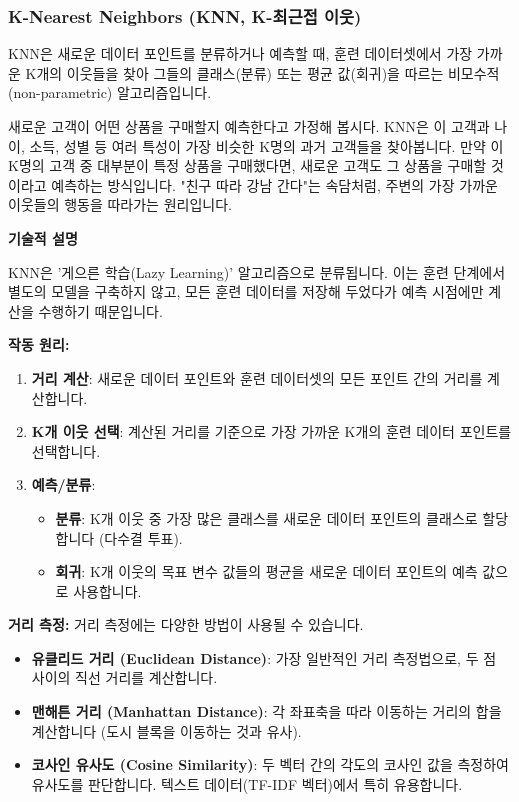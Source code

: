 \documentclass[11pt,a4paper]{article}
\theoremstyle{definition}
\begin{document}
\subsubsection{K-Nearest Neighbors (KNN, K-최근접 이웃)}

\begin{summarybox}[title={한 줄 핵심 요약}]
KNN은 새로운 데이터 포인트를 분류하거나 예측할 때, 훈련 데이터셋에서 가장 가까운 K개의 이웃들을 찾아 그들의 클래스(분류) 또는 평균 값(회귀)을 따르는 비모수적(non-parametric) 알고리즘입니다.
\end{summarybox}

\begin{examplebox}[title={직관적 예시/비유}]
새로운 고객이 어떤 상품을 구매할지 예측한다고 가정해 봅시다. KNN은 이 고객과 나이, 소득, 성별 등 여러 특성이 가장 비슷한 K명의 과거 고객들을 찾아봅니다. 만약 이 K명의 고객 중 대부분이 특정 상품을 구매했다면, 새로운 고객도 그 상품을 구매할 것이라고 예측하는 방식입니다. "친구 따라 강남 간다"는 속담처럼, 주변의 가장 가까운 이웃들의 행동을 따라가는 원리입니다.
\end{examplebox}

\textbf{기술적 설명}

KNN은 '게으른 학습(Lazy Learning)' 알고리즘으로 분류됩니다. 이는 훈련 단계에서 별도의 모델을 구축하지 않고, 모든 훈련 데이터를 저장해 두었다가 예측 시점에만 계산을 수행하기 때문입니다.

\textbf{작동 원리:}
\begin{enumerate}
    \item \textbf{거리 계산}: 새로운 데이터 포인트와 훈련 데이터셋의 모든 포인트 간의 거리를 계산합니다.
    \item \textbf{K개 이웃 선택}: 계산된 거리를 기준으로 가장 가까운 K개의 훈련 데이터 포인트를 선택합니다.
    \item \textbf{예측/분류}:
        \begin{itemize}
            \item \textbf{분류}: K개 이웃 중 가장 많은 클래스를 새로운 데이터 포인트의 클래스로 할당합니다 (다수결 투표).
            \item \textbf{회귀}: K개 이웃의 목표 변수 값들의 평균을 새로운 데이터 포인트의 예측 값으로 사용합니다.
        \end{itemize}
\end{enumerate}

\textbf{거리 측정:}
거리 측정에는 다양한 방법이 사용될 수 있습니다.
\begin{itemize}
    \item \textbf{유클리드 거리 (Euclidean Distance)}: 가장 일반적인 거리 측정법으로, 두 점 사이의 직선 거리를 계산합니다.
    \item \textbf{맨해튼 거리 (Manhattan Distance)}: 각 좌표축을 따라 이동하는 거리의 합을 계산합니다 (도시 블록을 이동하는 것과 유사).
    \item \textbf{코사인 유사도 (Cosine Similarity)}: 두 벡터 간의 각도의 코사인 값을 측정하여 유사도를 판단합니다. 텍스트 데이터(TF-IDF 벡터)에서 특히 유용합니다.
\end{itemize}
\end{document}
